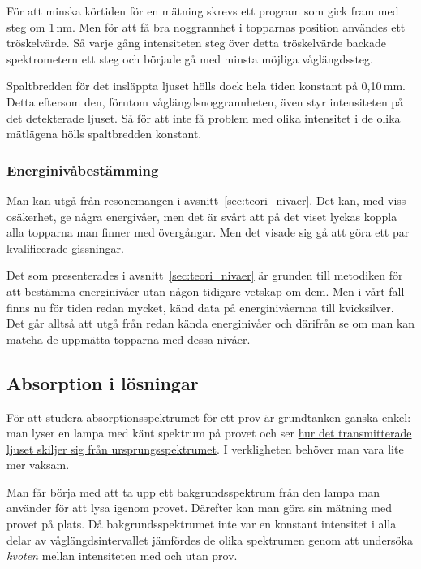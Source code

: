 \documentclass[11pt,a4paper]{article}
\begin{document}
För att minska körtiden för en mätning skrevs ett program som gick
fram med steg om 1\,nm. Men för att få bra noggrannhet i topparnas
position användes ett tröskelvärde. Så varje gång intensiteten steg
över detta tröskelvärde backade spektrometern ett steg och började gå
med minsta möjliga våglängdssteg. 

Spaltbredden för det insläppta ljuset hölls dock hela tiden
konstant på 0,10\,mm. Detta eftersom den, förutom
våglängdsnoggrannheten, även styr intensiteten på det detekterade
ljuset. Så för att inte få problem med olika intensitet i de olika
mätlägena hölls spaltbredden konstant. 

\subsubsection{Energinivåbestämming}
Man kan utgå från resonemangen i avsnitt~\ref{sec:teori_nivaer}. Det
kan, med viss osäkerhet, ge några energivåer, men det är svårt att på
det viset lyckas koppla alla topparna man finner med övergångar. Men
det visade sig gå att göra ett par kvalificerade gissningar. 

Det som presenterades i avsnitt~\ref{sec:teori_nivaer} är grunden till
metodiken för att bestämma energinivåer utan någon tidigare vetskap om
dem. Men i vårt fall finns nu för tiden redan mycket, känd data på
energinivåernna till kvicksilver. Det går alltså att utgå från redan
kända energinivåer och därifrån se om man kan matcha de uppmätta
topparna med dessa nivåer. 


\subsection{Absorption i lösningar}

För att studera absorptionsspektrumet för ett prov är grundtanken
ganska enkel: man lyser en lampa med känt spektrum på provet och ser
\href{https://xkcd.com/1517/}{hur det transmitterade ljuset skiljer
  sig från ursprungsspektrumet}. I verkligheten behöver man vara lite
mer vaksam. 

Man får börja med att ta upp ett bakgrundsspektrum från den lampa man
använder för att lysa igenom provet. Därefter kan man göra sin mätning
med provet på plats. Då bakgrundsspektrumet inte var en konstant
intensitet i alla delar av våglängdsintervallet jämfördes de olika
spektrumen genom att undersöka \emph{kvoten} mellan intensiteten med
och utan prov. 
\end{document}
